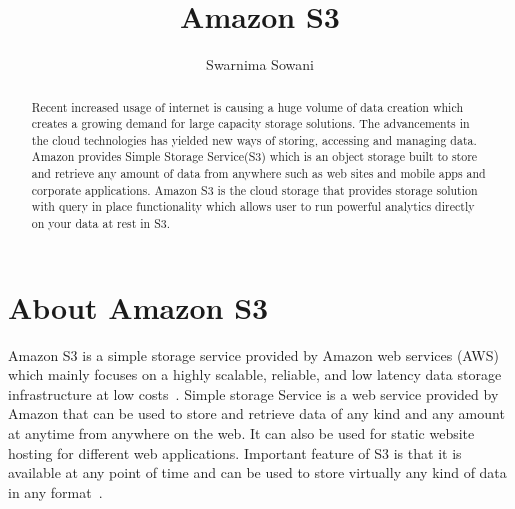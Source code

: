 
\title{Amazon S3}


\author{Swarnima Sowani}


\renewcommand{\shortauthors}{G. v. Laszewski}

\begin{abstract}

Recent increased usage of internet is causing a huge volume of data creation
which creates a growing demand for large capacity storage solutions. The
advancements in the cloud technologies has yielded new ways of storing,
accessing and managing data. Amazon provides Simple Storage Service(S3) 
which is an object storage built to store and retrieve any amount
of data from anywhere such as web sites and mobile apps and corporate
applications. Amazon S3 is the cloud storage that provides storage solution
with query in place functionality which allows user to run powerful analytics
directly on your data at rest in S3.

\end{abstract}


\maketitle

\section{About Amazon S3}

Amazon S3 is a simple storage service provided by Amazon web services (AWS)
which mainly focuses on a highly scalable, reliable, and low latency data
storage infrastructure at low costs~\cite{hid-sp18-420-amazon-S3-FAQ}. Simple
storage Service is a web service provided by Amazon that can be used to store
and retrieve data of any kind and any amount at anytime from anywhere on the
web. It can also be used for static website hosting for different web
applications. Important feature of S3 is that it is available at any point of
time and can be used to store virtually any kind of data in any
format~\cite{hid-sp18-420-amazon-S3-FAQ}.

